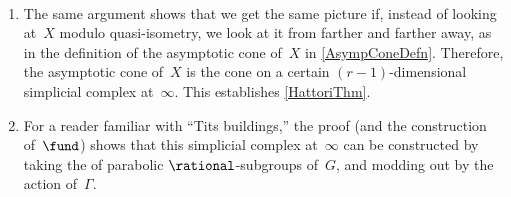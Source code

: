 \begin{rems} \label{LargeScaleRems} \ 
\noprelistbreak
	\begin{enumerate}

	\item The same argument shows that we get the same picture if, instead of looking at~$X$ modulo quasi-isometry, we look at it from farther and farther away, as in the definition of the asymptotic cone of~$X$ in \cref{AsympConeDefn}. Therefore, the asymptotic cone of~$X$ is the cone on a certain $(r-1)$-dimensional simplicial complex at~$\infty$. This establishes \cref{HattoriThm}.

	\item \label{LargeScaleRems-Tits}
	For a reader familiar with ``Tits buildings\zz,'' the proof (and the construction of~$\fund$) shows that this simplicial complex at~$\infty$ can be constructed by taking the  of parabolic $\rational$-subgroups of~$G$, and modding out by the action of~$\Gamma$.

	\end{enumerate}
\end{rems}

